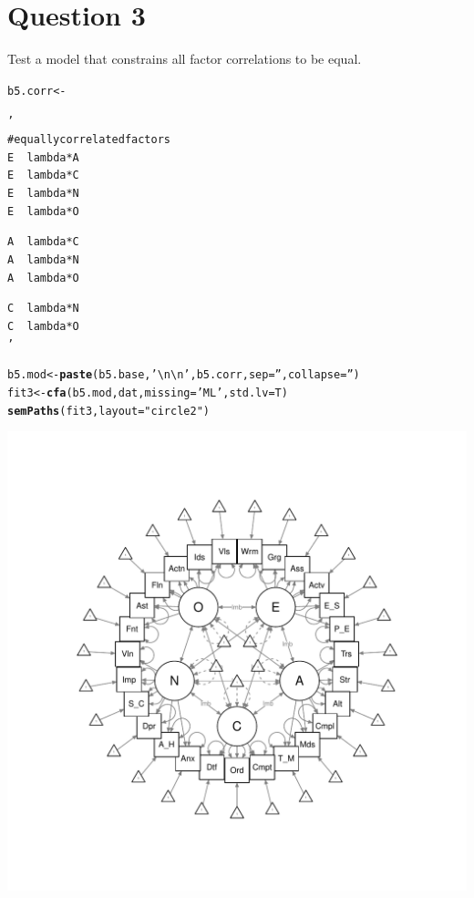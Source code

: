 \documentclass{article}\usepackage[]{graphicx}\usepackage[]{color}
\makeatletter
\def\maxwidth{ %
  \ifdim\Gin@nat@width>\linewidth
    \linewidth
  \else
    \Gin@nat@width
  \fi
}
\newcommand{\hlstr}[1]{\textcolor[rgb]{0.192,0.494,0.8}{#1}}%
\newcommand{\hlstd}[1]{\textcolor[rgb]{0.345,0.345,0.345}{#1}}%
\newcommand{\hlkwb}[1]{\textcolor[rgb]{0.69,0.353,0.396}{#1}}%
\newcommand{\hlkwc}[1]{\textcolor[rgb]{0.333,0.667,0.333}{#1}}%
\newcommand{\hlkwd}[1]{\textcolor[rgb]{0.737,0.353,0.396}{\textbf{#1}}}%
\newenvironment{kframe}{%
 \def\at@end@of@kframe{}%
 \ifinner\ifhmode%
  \def\at@end@of@kframe{\end{minipage}}%
  \begin{minipage}{\columnwidth}%
 \fi\fi%
 \def\FrameCommand##1{\hskip\@totalleftmargin \hskip-\fboxsep
 \colorbox{shadecolor}{##1}\hskip-\fboxsep
     \hskip-\linewidth \hskip-\@totalleftmargin \hskip\columnwidth}%
 \MakeFramed {\advance\hsize-\width
   \@totalleftmargin\z@ \linewidth\hsize
   \@setminipage}}%
 {\par\unskip\endMakeFramed%
 \at@end@of@kframe}
\newenvironment{knitrout}{}{} %
\makeatother
\begin{document}
\section{Question 3}
Test a model that constrains all factor correlations to be equal.  
\begin{knitrout}
\color{fgcolor}\begin{kframe}
\begin{alltt}
\hlstd{b5.corr} \hlkwb{<-} \hlstr{'
# equally correlated factors
E ~~ lambda*A
E ~~ lambda*C
E ~~ lambda*N
E ~~ lambda*O

A ~~ lambda*C
A ~~ lambda*N
A ~~ lambda*O

C ~~ lambda*N
C ~~ lambda*O
'}

\hlstd{b5.mod} \hlkwb{<-} \hlkwd{paste}\hlstd{(b5.base,} \hlstr{'\textbackslash{}n\textbackslash{}n'}\hlstd{, b5.corr,} \hlkwc{sep} \hlstd{=} \hlstr{''}\hlstd{,} \hlkwc{collapse} \hlstd{=} \hlstr{''}\hlstd{)}
\hlstd{fit3} \hlkwb{<-} \hlkwd{cfa}\hlstd{(b5.mod, dat,} \hlkwc{missing} \hlstd{=} \hlstr{'ML'}\hlstd{,} \hlkwc{std.lv} \hlstd{= T)}
\hlkwd{semPaths}\hlstd{(fit3,} \hlkwc{layout} \hlstd{=} \hlstr{"circle2"}\hlstd{)}
\end{alltt}
\end{kframe}
\includegraphics[width=\maxwidth]{figure/unnamed-chunk-8-1} 

\end{knitrout}
\end{document}
